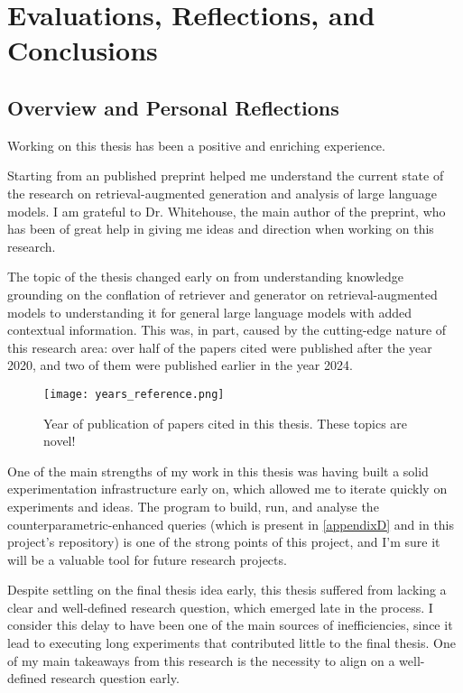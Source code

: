 \section{Evaluations, Reflections, and Conclusions}

\subsection{Overview and Personal Reflections}

Working on this thesis has been a positive and enriching experience.

Starting from an published preprint \citep{knowledge_grounding_retrieval_augmented} helped me understand the current state of the research on retrieval-augmented generation and analysis of large language models. 
I am grateful to Dr. Whitehouse, the main author of the preprint, who has been of great help in giving me ideas and direction when working on this research.

The topic of the thesis changed early on from understanding knowledge grounding on the conflation of retriever and generator on retrieval-augmented models to understanding it for general large language models with added contextual information.
This was, in part, caused by the cutting-edge nature of this research area: over half of the papers cited were published after the year 2020, and two of them were published earlier in the year 2024.

\begin{figure}[ht]
	\centering
	\texttt{[image: years\_reference.png]}
	\caption{Year of publication of papers cited in this thesis. These topics are novel!}
\end{figure}

One of the main strengths of my work in this thesis was having built a solid experimentation infrastructure early on, which allowed me to iterate quickly on experiments and ideas.
The program to build, run, and analyse the counterparametric-enhanced queries (which is present in \cref{appendixD} and in this project's repository) is one of the strong points of this project, and I'm sure it will be a valuable tool for future research projects.

Despite settling on the final thesis idea early, this thesis suffered from lacking a clear and well-defined research question, which emerged late in the process.
I consider this delay to have been one of the main sources of inefficiencies, since it lead to executing long experiments that contributed little to the final thesis.
One of my main takeaways from this research is the necessity to align on a well-defined research question early.

